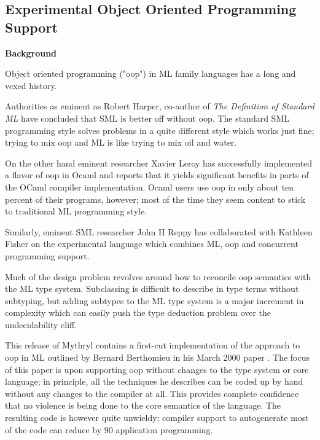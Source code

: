 \cutend*

\subsection{Experimental Object Oriented Programming Support}
\label{section:tut:full-monte:experimental-object-oriented-programming-support}

{\bf Background}

Object oriented programming ("oop") in ML family languages has a long and vexed history.

Authorities as eminent as Robert Harper, co-author of {\it The Definition of Standard ML} 
have concluded that SML is better off without oop.  The standard SML programming style 
solves problems in a quite different style which works just fine;  trying to mix oop and 
ML is like trying to mix oil and water.

On the other hand eminent researcher Xavier Leroy has successfully implemented a flavor 
of oop in Ocaml and reports that it yields significant benefits in parts of the OCaml 
compiler implementation.  Ocaml users use oop in only about ten percent of their programs, 
however;  most of the time they seem content to stick to traditional ML programming style. 

Similarly, eminent SML researcher John H Reppy has collaborated with Kathleen Fisher on 
the experimental language  which combines ML, oop and concurrent 
programming support.

Much of the design problem revolves around how to reconcile oop semantics with the 
ML type system.  Subclassing is difficult to describe in type terms without subtyping, 
but adding subtypes to the ML type system is a major increment in complexity which can 
easily push the type deduction problem over the undecidability cliff.

This release of Mythryl contains a first-cut implementation of the 
approach to oop in ML outlined by Bernard Berthomieu in his March 2000 
paper . 
The focus of this paper is upon supporting oop without changes to the 
type system or core language; in principle, all the techniques he 
describes can be coded up by hand without any changes to the compiler 
at all.  This provides complete confidence that no violence is being 
done to the core semantics of the language.  The resulting code is 
however quite unwieldy; compiler support to autogenerate most of the 
code can reduce by 90%
application programming.

